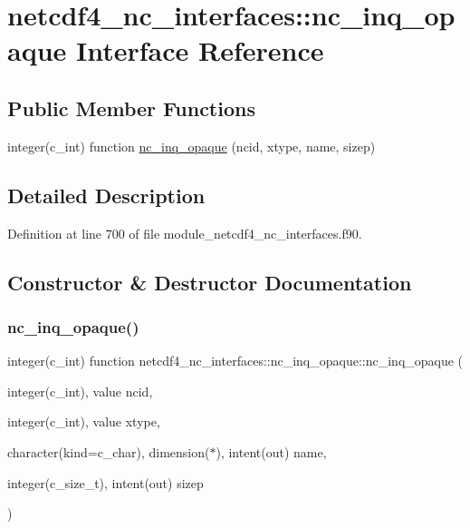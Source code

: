 \hypertarget{interfacenetcdf4__nc__interfaces_1_1nc__inq__opaque}{}\section{netcdf4\+\_\+nc\+\_\+interfaces\+:\+:nc\+\_\+inq\+\_\+opaque Interface Reference}
\label{interfacenetcdf4__nc__interfaces_1_1nc__inq__opaque}
\subsection*{Public Member Functions}
\begin{DoxyCompactItemize}
\item 
integer(c\+\_\+int) function \hyperlink{interfacenetcdf4__nc__interfaces_1_1nc__inq__opaque_a5a87074bcd5fe059f91ac28d1be0ac88}{nc\+\_\+inq\+\_\+opaque} (ncid, xtype, name, sizep)
\end{DoxyCompactItemize}


\subsection{Detailed Description}


Definition at line 700 of file module\+\_\+netcdf4\+\_\+nc\+\_\+interfaces.\+f90.



\subsection{Constructor \& Destructor Documentation}
\mbox{\label{interfacenetcdf4__nc__interfaces_1_1nc__inq__opaque_a5a87074bcd5fe059f91ac28d1be0ac88}} 
\subsubsection{\texorpdfstring{nc\+\_\+inq\+\_\+opaque()}{nc\_inq\_opaque()}}
{\footnotesize\ttfamily integer(c\+\_\+int) function netcdf4\+\_\+nc\+\_\+interfaces\+::nc\+\_\+inq\+\_\+opaque\+::nc\+\_\+inq\+\_\+opaque (\begin{DoxyParamCaption}\item[{integer(c\+\_\+int), value}]{ncid,  }\item[{integer(c\+\_\+int), value}]{xtype,  }\item[{character(kind=c\+\_\+char), dimension($\ast$), intent(out)}]{name,  }\item[{integer(c\+\_\+size\+\_\+t), intent(out)}]{sizep }\end{DoxyParamCaption})}



